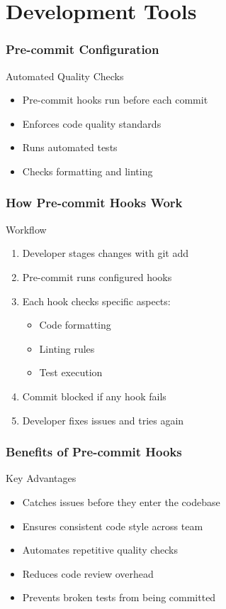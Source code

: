 \documentclass{beamer}
\begin{document}
\section{Development Tools}
\begin{frame}
    \frametitle{Pre-commit Configuration}
    \begin{block}{Automated Quality Checks}
        \begin{itemize}
            \item Pre-commit hooks run before each commit
            \item Enforces code quality standards
            \item Runs automated tests
            \item Checks formatting and linting
        \end{itemize}
    \end{block}
\end{frame}

\begin{frame}
    \frametitle{How Pre-commit Hooks Work}
    \begin{block}{Workflow}
        \begin{enumerate}
            \item Developer stages changes with git add
            \item Pre-commit runs configured hooks
            \item Each hook checks specific aspects:
                \begin{itemize}
                    \item Code formatting
                    \item Linting rules
                    \item Test execution
                \end{itemize}
            \item Commit blocked if any hook fails
            \item Developer fixes issues and tries again
        \end{enumerate}
    \end{block}
\end{frame}

\begin{frame}
    \frametitle{Benefits of Pre-commit Hooks}
    \begin{alertblock}{Key Advantages}
        \begin{itemize}
            \item Catches issues before they enter the codebase
            \item Ensures consistent code style across team
            \item Automates repetitive quality checks
            \item Reduces code review overhead
            \item Prevents broken tests from being committed
        \end{itemize}
    \end{alertblock}
\end{frame}
\end{document}
